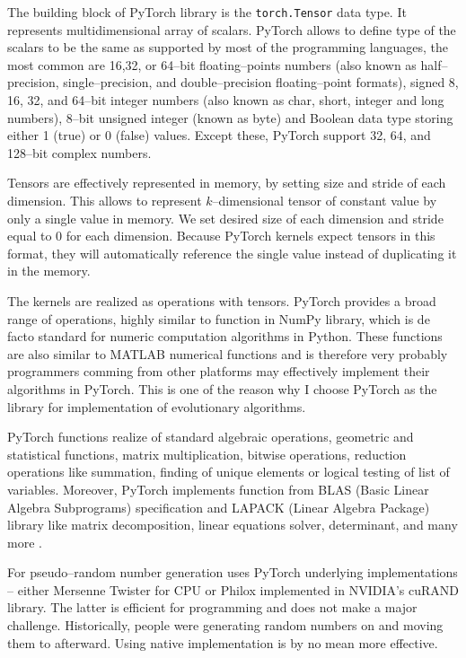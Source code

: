 The building block of PyTorch library is the \lstinline|torch.Tensor| data type. It represents multidimensional array of scalars. PyTorch allows to define type of the scalars to be the same as supported by most of the programming languages, the most common are 16,32, or 64--bit floating--points numbers (also known as half--precision, single--precision, and double--precision floating--point formats), signed 8, 16, 32, and 64--bit integer numbers (also known as char, short, integer and long numbers), 8--bit unsigned integer (known as byte) and Boolean data type storing either 1 (true) or 0 (false) values. Except these, PyTorch support 32, 64, and 128--bit complex numbers.

Tensors are effectively represented in memory, by setting size and stride of each dimension. This allows to represent $k$--dimensional tensor of constant value by only a single value in memory. We set desired size of each dimension and stride equal to $0$ for each dimension. Because PyTorch kernels expect tensors in this format, they will automatically reference the single value instead of duplicating it in the memory.

The kernels are realized as operations with tensors. PyTorch provides a broad range of operations, highly similar to function in NumPy library, which is de facto standard for numeric computation algorithms in Python. These functions are also similar to MATLAB numerical functions and is therefore very probably programmers comming from other platforms may effectively implement their algorithms in PyTorch. This is one of the reason why I choose PyTorch as the library for implementation of evolutionary algorithms.

PyTorch functions realize of standard algebraic operations, geometric and statistical functions, matrix multiplication, bitwise operations, reduction operations like summation, finding of unique elements or logical testing of list of variables. Moreover, PyTorch implements function from BLAS (Basic Linear Algebra Subprograms) specification and LAPACK (Linear Algebra Package) library like matrix decomposition, linear equations solver, determinant, and many more \citep{PyTorchDoc}.

For pseudo--random number generation uses PyTorch underlying implementations -- either Mersenne Twister for CPU or Philox implemented in NVIDIA's cuRAND library. The latter is efficient for \cuda programming and does not make a major challenge. Historically, people were generating random numbers on \cpu and moving them to \gpu afterward. Using native \cuda implementation is by no mean more effective.

